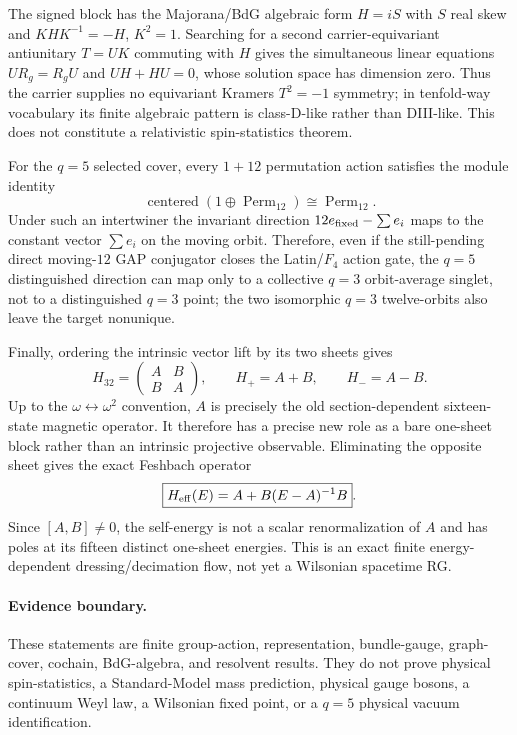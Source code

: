 The signed block has the Majorana/BdG algebraic form $H=iS$ with $S$ real skew
and $KHK^{-1}=-H$, $K^2=1$.  Searching for a second carrier-equivariant
antiunitary $T=UK$ commuting with $H$ gives the simultaneous linear equations
$UR_g=R_gU$ and $UH+HU=0$, whose solution space has dimension zero.  Thus the
carrier supplies no equivariant Kramers $T^2=-1$ symmetry; in tenfold-way
vocabulary its finite algebraic pattern is class-D-like rather than DIII-like.
This does not constitute a relativistic spin-statistics theorem.

For the $q=5$ selected cover, every $1+12$ permutation action satisfies the
module identity
\[
 \operatorname{centered}(1\oplus\operatorname{Perm}_{12})
 \cong \operatorname{Perm}_{12}.
\]
Under such an intertwiner the invariant direction
$12e_{\rm fixed}-\sum e_i$ maps to the constant vector $\sum e_i$ on the moving
orbit.  Therefore, even if the still-pending direct moving-$12$ GAP conjugator
closes the Latin/$F_4$ action gate, the $q=5$ distinguished direction can map
only to a collective $q=3$ orbit-average singlet, not to a distinguished $q=3$
point; the two isomorphic $q=3$ twelve-orbits also leave the target nonunique.

Finally, ordering the intrinsic vector lift by its two sheets gives
\[
 H_{32}=\begin{pmatrix}A&B\\ B&A\end{pmatrix},\qquad
 H_+=A+B,\qquad H_-=A-B.
\]
Up to the $\omega\leftrightarrow\omega^2$ convention, $A$ is precisely the old
section-dependent sixteen-state magnetic operator.  It therefore has a precise
new role as a bare one-sheet block rather than an intrinsic projective
observable.  Eliminating the opposite sheet gives the exact Feshbach operator
\[
 \boxed{H_{\rm eff}(E)=A+B(E-A)^{-1}B}.
\]
Since $[A,B]\ne0$, the self-energy is not a scalar renormalization of $A$ and
has poles at its fifteen distinct one-sheet energies.  This is an exact finite
energy-dependent dressing/decimation flow, not yet a Wilsonian spacetime RG.

\paragraph{Evidence boundary.}
These statements are finite group-action, representation, bundle-gauge,
graph-cover, cochain, BdG-algebra, and resolvent results.  They do not prove
physical spin-statistics, a Standard-Model mass prediction, physical gauge
bosons, a continuum Weyl law, a Wilsonian fixed point, or a $q=5$ physical
vacuum identification.
